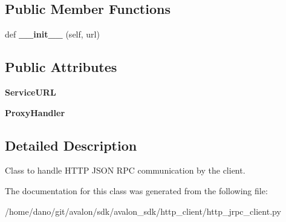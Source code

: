 \subsection*{Public Member Functions}
\begin{DoxyCompactItemize}
\item 
\mbox{\label{classavalon__sdk_1_1http__client_1_1http__jrpc__client_1_1HttpJrpcClient_a3c4ec9e85807a177516bf0afde270468}} 
def {\bfseries \+\_\+\+\_\+init\+\_\+\+\_\+} (self, url)
\end{DoxyCompactItemize}
\subsection*{Public Attributes}
\begin{DoxyCompactItemize}
\item 
\mbox{\label{classavalon__sdk_1_1http__client_1_1http__jrpc__client_1_1HttpJrpcClient_a5401df42e577c7bee9350b7ce84b61d2}} 
{\bfseries Service\+U\+RL}
\item 
\mbox{\label{classavalon__sdk_1_1http__client_1_1http__jrpc__client_1_1HttpJrpcClient_af52f83c54f41953e94467a14f3b9223a}} 
{\bfseries Proxy\+Handler}
\end{DoxyCompactItemize}


\subsection{Detailed Description}
\begin{DoxyVerb}Class to handle HTTP JSON RPC communication by the client.
\end{DoxyVerb}
 

The documentation for this class was generated from the following file\+:\begin{DoxyCompactItemize}
\item 
/home/dano/git/avalon/sdk/avalon\+\_\+sdk/http\+\_\+client/http\+\_\+jrpc\+\_\+client.\+py\end{DoxyCompactItemize}
